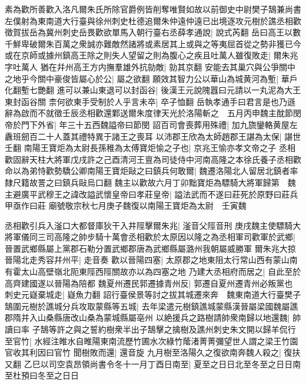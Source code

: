 素為歡所善歡入洛凡爾朱氏所除官爵例皆削奪唯賢如故以前御史中尉樊子鵠兼尚書左僕射為東南道大行臺與徐州刺史杜德追爾朱仲遠仲遠已出境逐攻元樹於譙丞相歡徵賀拔岳為冀州刺史岳畏歡欲單馬入朝行臺右丞薛孝通說|{
	說式芮翻}
岳曰高王以數千鮮卑破爾朱百萬之衆誠亦難敵然諸將或素居其上或與之等夷屈首從之勢非獲已今或在京師或據州鎮高王除之則失人望留之則為腹心之疾且吐萬人雖復敗走|{
	爾朱兆字吐萬人}
猶在幷州高王方内撫羣雄外抗勍敵|{
	勍其京翻}
安能去其巢穴與公爭關中之地乎今關中豪俊皆屬心於公|{
	屬之欲翻}
願效其智力公以華山為城黄河為塹|{
	華戶化翻塹七艷翻}
進可以兼山東退可以封函谷|{
	後漢王元說隗囂曰元請以一丸泥為大王東封函谷關}
柰何欲東手受制於人乎言未卒|{
	卒子恤翻}
岳執孝通手曰君言是也乃遜辭為啟而不就徵壬辰丞相歡還鄴送爾朱度律天光於洛陽斬之　五月丙申魏主酖節閔帝於門下外省|{
	年三十五西魏謚帝曰節閔}
詔百司會喪葬用殊禮|{
	加九旒鑾輅黄屋左纛班劒百二十人蓋其禮特異于諸王之喪耳}
以沛郡王欣為太師趙郡王諶為太保|{
	諶世壬翻}
南陽王寶炬為太尉長孫稚為太傅寶炬愉之子也|{
	京兆王愉亦孝文帝之子}
丞相歡固辭天柱大將軍戊戌許之己酉清河王亶為司徒侍中河南高隆之本徐氏養子丞相歡命以為弟恃歡勢驕公卿南陽王寶炬敺之曰鎮兵何敢爾|{
	魏遷洛陽北人留居北鎮者率隸尺籍故詈之曰鎮兵敺烏口翻}
魏主以歡故六月丁卯黜寶炬為驃騎大將軍歸第　魏主避廣平武穆王之諱改謚武懷皇帝曰孝莊皇帝|{
	謚法武而不遂曰莊死於原野曰莊兵甲亟作曰莊}
廟號敬宗秋七月庚子魏復以南陽王寶炬為太尉　壬寅魏

丞相歡引兵入滏口大都督庫狄干入井陘擊爾朱兆|{
	滏音父陘音刑}
庚戌魏主使驃騎大將軍儀同三司高隆之帥步騎十萬會丞相歡於太原因以隆之為丞相軍司歡軍於武鄉|{
	晉置武鄉縣屬上黨郡石勒分置武鄉郡唐為武鄉縣屬潞州我朝屬威勝軍}
爾朱兆大掠晉陽北走秀容幷州平|{
	走音奏}
歡以晉陽四塞|{
	太原郡之地東阻太行常山西有蒙山南有霍太山高壁嶺北阨東陘西陘關故亦以為四塞之地}
乃建大丞相府而居之|{
	自此至於高齊建國遂以晉陽為陪都}
魏夏州遷民郭遷據青州反|{
	郭遷自夏州遷青州必叛黨也}
刺史元嶷棄城走|{
	嶷魚力翻}
詔行臺侯景等討之拔其城遷來奔　魏東南道大行臺樊子鵠圍元樹於譙城分兵攻取蒙縣等五城|{
	去年梁遣元樹鎮譙城蒙縣漢晉屬梁國魏屬譙郡隋并入山桑縣唐改山桑為蒙城縣屬亳州}
以絶援兵之路樹請帥衆南歸以地還魏|{
	帥讀曰率}
子鵠等許之與之誓約樹衆半出子鵠擊之擒樹及譙州刺史朱文開以歸羊侃行至官竹|{
	水經注睢水自睢陽東南流歷竹圃水次綠竹䕃渚菁菁彌望世人謂之梁王竹園官收其利因曰官竹}
聞樹敗而還|{
	還音旋}
九月樹至洛陽久之復欲南奔魏人殺之|{
	復扶又翻}
乙巳以司空袁昂領尚書令冬十一月丁酉日南至|{
	夏至之日日北至冬至之日日南至杜預曰冬至之日日}



